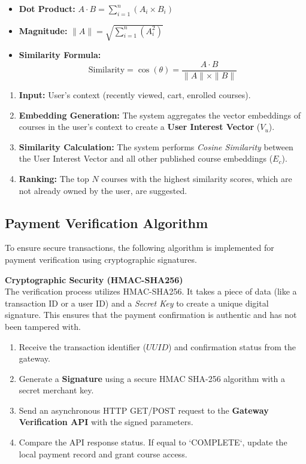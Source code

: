 \begin{itemize}
    \item \textbf{Dot Product:} $A \cdot B = \sum_{i=1}^n (A_i \times B_i)$
    \item \textbf{Magnitude:} $\|A\| = \sqrt{\sum_{i=1}^n (A_i^2)}$
    \item \textbf{Similarity Formula:} 
    \[ \text{Similarity} = \cos(\theta) = \frac{A \cdot B}{\|A\| \times \|B\|} \]
\end{itemize}

\begin{enumerate}
    \item \textbf{Input:} User's context (recently viewed, cart, enrolled courses).
    \item \textbf{Embedding Generation:} The system aggregates the vector embeddings of courses in the user's context to create a \textbf{User Interest Vector} ($V_u$).
    \item \textbf{Similarity Calculation:} The system performs \textit{Cosine Similarity} between the User Interest Vector and all other published course embeddings ($E_c$).
    \item \textbf{Ranking:} The top $N$ courses with the highest similarity scores, which are not already owned by the user, are suggested.
\end{enumerate}

\subsection{Payment Verification Algorithm}
To ensure secure transactions, the following algorithm is implemented for payment verification using cryptographic signatures.

\textbf{Cryptographic Security (HMAC-SHA256)} \\
The verification process utilizes HMAC-SHA256. It takes a piece of data (like a transaction ID or a user ID) and a \textit{Secret Key} to create a unique digital signature. This ensures that the payment confirmation is authentic and has not been tampered with.

\begin{enumerate}
    \item Receive the transaction identifier ($UUID$) and confirmation status from the gateway.
    \item Generate a \textbf{Signature} using a secure HMAC SHA-256 algorithm with a secret merchant key.
    \item Send an asynchronous HTTP GET/POST request to the \textbf{Gateway Verification API} with the signed parameters.
    \item Compare the API response status. If equal to `COMPLETE`, update the local payment record and grant course access.
\end{enumerate}

